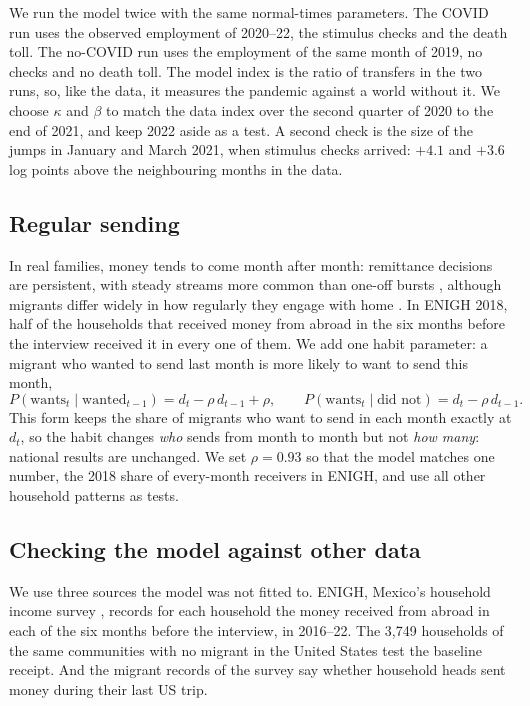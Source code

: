 \documentclass[11pt]{article}
\begin{document}
We run the model twice with the same normal-times parameters. The COVID run uses the observed employment of 2020--22, the stimulus checks and the death toll. The no-COVID run uses the employment of the same month of 2019, no checks and no death toll. The model index is the ratio of transfers in the two runs, so, like the data, it measures the pandemic against a world without it. We choose $\kappa$ and $\beta$ to match the data index over the second quarter of 2020 to the end of 2021, and keep 2022 aside as a test. A second check is the size of the jumps in January and March 2021, when stimulus checks arrived: $+4.1$ and $+3.6$ log points above the neighbouring months in the data.

\subsection{Regular sending}

In real families, money tends to come month after month: remittance decisions are persistent, with steady streams more common than one-off bursts \cite{bettin2016steady}, although migrants differ widely in how regularly they engage with home \cite{waldinger2008between}. In ENIGH 2018, half of the households that received money from abroad in the six months before the interview received it in every one of them. We add one habit parameter: a migrant who wanted to send last month is more likely to want to send this month,
\begin{equation}
P(\text{wants}_t \mid \text{wanted}_{t-1}) = d_t - \rho\, d_{t-1} + \rho, \qquad P(\text{wants}_t \mid \text{did not}) = d_t - \rho\, d_{t-1}.
\end{equation}
This form keeps the share of migrants who want to send in each month exactly at $d_t$, so the habit changes \emph{who} sends from month to month but not \emph{how many}: national results are unchanged. We set $\rho = 0.93$ so that the model matches one number, the 2018 share of every-month receivers in ENIGH, and use all other household patterns as tests.

\subsection{Checking the model against other data}

We use three sources the model was not fitted to. ENIGH, Mexico's household income survey \cite{enigh}, records for each household the money received from abroad in each of the six months before the interview, in 2016--22. The 3,749 households of the same communities with no migrant in the United States test the baseline receipt. And the migrant records of the survey say whether household heads sent money during their last US trip.
\end{document}
